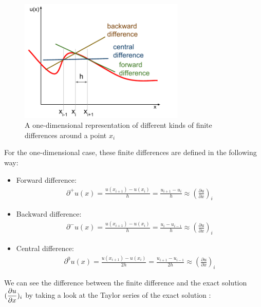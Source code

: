\begin{figure}[h]
	\centering
	\includegraphics[width=0.7\textwidth]{chapters/chapter01/finite_differences.pdf}
	\caption{A one-dimensional representation of different kinds of finite differences around a point $x_i$}
	\label{fig:finite_differences}
\end{figure}

For the one-dimensional case, these finite differences are defined in the following way:
\begin{itemize}
\item Forward difference:
\begin{align}
\partial ^+ u(x) = \frac{u(x_{i+1}) - u(x_i)}{h} = \frac{u_{i+1} - u_i}{h} \approx (\frac{\partial u}{\partial x})_i %
\end{align}
\item Backward difference: 
\begin{align}
\partial ^- u(x) = \frac{u(x_{i+1}) - u(x_i)}{h} = \frac{u_{i} - u_{i-1}}{h} \approx (\frac{\partial u}{\partial x})_i %
\end{align}
\item Central difference: 
\begin{align}
\partial ^0 u(x) = \frac{u(x_{i+1}) - u(x_i)}{2h} = \frac{u_{i+1} - u_{i-1}}{2h} \approx (\frac{\partial u}{\partial x})_i %
\end{align}
\end{itemize}



We can see the difference between the finite difference and the exact solution $\mathlarger{(\frac{\partial u}{\partial x})_i}$ by taking a look at the Taylor series of the exact solution \cite{langer}:

